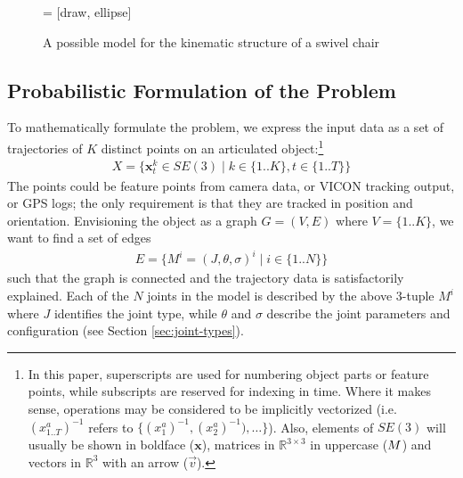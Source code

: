 \documentclass[letterpaper, 10 pt, conference]{ieeeconf}  %
\def\xmat{\uppercase}    \def\xmatstr{in uppercase}
\def\xvec{\vec}          \def\xvecstr{with an arrow}
\def\xse{\bm}            \def\xsestr{in boldface}
\begin{document}
        \begin{figure}[ht]
          \centering
           = [draw, ellipse]
          \caption{A possible model for the kinematic structure of a swivel chair}
          \label{fig:Sswivel}
        \end{figure}

\subsection{Probabilistic Formulation of the Problem}
To mathematically formulate the problem, we express the input data as a set of trajectories of $K$ distinct points on an articulated object:\footnote{In this paper, superscripts are used for numbering object parts or feature points, while subscripts are reserved for indexing in time. Where it makes sense, operations may be considered to be implicitly vectorized (i.e. $(x_{1..T}^a)^{-1}$ refers to $\{(x_1^a)^{-1}, (x_2^a)^{-1}), \dots\}$). Also, elements of $SE(3)$ will usually be shown \xsestr{} ($\xse{x}$), matrices in $\mathbb{R}^{3 \times 3}$ \xmatstr{} ($\xmat{m}$) and vectors in $\mathbb{R}^3$ \xvecstr{} ($\xvec{v}$).}
\begin{align}
  X = \{ \xse{x}_t^k \in SE(3) \mid k \in \{1..K\}, t \in \{1..T\} \}
\end{align}
The points could be feature points from camera data, or VICON tracking output, or GPS logs; the only requirement is that they are tracked in position and orientation. Envisioning the object as a graph $G = (V,E)$ where $V = \{1..K\}$, we want to find a set of edges
\begin{align}
  E = \{M^i = (J,\theta,\sigma)^i \mid i \in \{1..N\}\} \label{eqn:m-tuple}
\end{align}
such that the graph is connected and the trajectory data is satisfactorily explained. Each of the $N$ joints in the model is described by the above 3-tuple $M^i$ where $J$ identifies the joint type, while $\theta$ and $\sigma$ describe the joint parameters and configuration (see Section \ref{sec:joint-types}).
\end{document}
